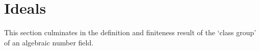 \section{Ideals}

This section culminates in the definition and finiteness result of the `class group' of an algebraic number field.
